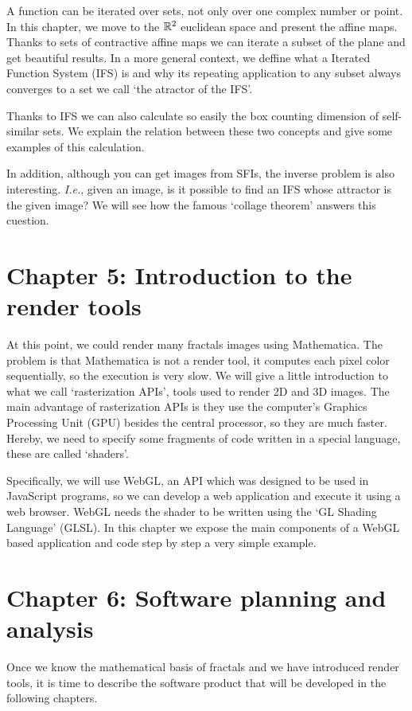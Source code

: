 A function can be iterated over sets, not only over one complex number or point. In this chapter, we move to the $\mathbb{R}^2$ euclidean space and present the affine maps. Thanks to sets of contractive affine maps we can iterate a subset of the plane and get beautiful results. In a more general context, we deffine what a Iterated Function System (IFS) is and why its repeating application to any subset always converges to a set we call `the atractor of the IFS'.

Thanks to IFS we can also calculate so easily the box counting dimension of self-similar sets. We explain the relation between these two concepts and give some examples of this calculation.

In addition, although you can get images from SFIs, the inverse problem is also interesting. \textit{I.e.}, given an image, is it possible to find an IFS whose attractor is the given image? We will see how the famous `collage theorem' answers this cuestion.

\section*{Chapter 5: Introduction to the render tools}

At this point, we could render many fractals images using Mathematica. The problem is that Mathematica is not a render tool, it computes each pixel color sequentially, so the execution is very slow. We will give a little introduction to what we call `rasterization APIs', tools used to render 2D and 3D images. The main advantage of rasterization APIs is they use the computer's Graphics Processing Unit (GPU) besides the central processor, so they are much faster. Hereby, we need to specify some fragments of code written in a special language, these are called `shaders'. 

Specifically, we will use WebGL, an API which was designed to be used in JavaScript programs, so we can develop a web application and execute it using a web browser. WebGL needs the shader to be written using the `GL Shading Language' (GLSL). In this chapter we expose the main components of a WebGL based application and code step by step a very simple example.

\section*{Chapter 6: Software planning and analysis}

Once we know the mathematical basis of fractals and we have introduced render tools, it is time to describe the software product that will be developed in the following chapters. 

